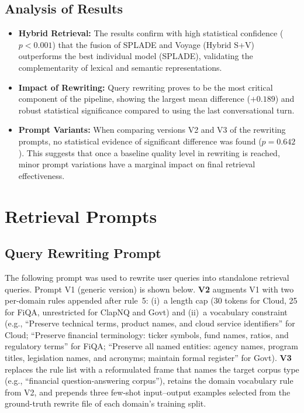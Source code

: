 \documentclass[11pt]{article}
\begin{document}
\subsection{Analysis of Results}

\begin{itemize}
    \item \textbf{Hybrid Retrieval:} The results confirm with high statistical confidence ($p < 0.001$) that the fusion of SPLADE and Voyage (Hybrid S+V) outperforms the best individual model (SPLADE), validating the complementarity of lexical and semantic representations.
    
    \item \textbf{Impact of Rewriting:} Query rewriting proves to be the most critical component of the pipeline, showing the largest mean difference ($+0.189$) and robust statistical significance compared to using the last conversational turn.
    
    \item \textbf{Prompt Variants:} When comparing versions V2 and V3 of the rewriting prompts, no statistical evidence of significant difference was found ($p = 0.642$). This suggests that once a baseline quality level in rewriting is reached, minor prompt variations have a marginal impact on final retrieval effectiveness.
\end{itemize}

\section{Retrieval Prompts}
\label{apx:prompts}

\subsection{Query Rewriting Prompt}

The following prompt was used to rewrite user queries into standalone retrieval queries. Prompt V1 (generic version) is shown below. \textbf{V2} augments V1 with two per-domain rules appended after rule~5: (i)~a length cap (30 tokens for Cloud, 25 for FiQA, unrestricted for ClapNQ and Govt) and (ii)~a vocabulary constraint (e.g., ``Preserve technical terms, product names, and cloud service identifiers'' for Cloud; ``Preserve financial terminology: ticker symbols, fund names, ratios, and regulatory terms'' for FiQA; ``Preserve all named entities: agency names, program titles, legislation names, and acronyms; maintain formal register'' for Govt). \textbf{V3} replaces the rule list with a reformulated frame that names the target corpus type (e.g., ``financial question-answering corpus''), retains the domain vocabulary rule from V2, and prepends three few-shot input--output examples selected from the ground-truth rewrite file of each domain's training split.
\end{document}
